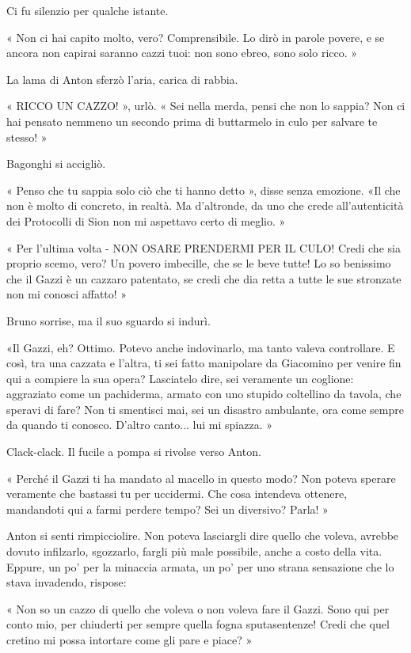 Ci fu silenzio per qualche istante.

« Non ci hai capito molto, vero? Comprensibile. Lo dirò in parole povere, e se ancora non capirai saranno cazzi tuoi: non sono ebreo, sono solo ricco. »

La lama di Anton sferzò l'aria, carica di rabbia.

« RICCO UN CAZZO! », urlò. « Sei nella merda, pensi che non lo sappia? Non ci hai pensato nemmeno un secondo prima di buttarmelo in culo per salvare te stesso! »

Bagonghi si accigliò.

« Penso che tu sappia solo ciò che ti hanno detto », disse senza emozione. «Il che non è molto di concreto, in realtà. Ma d'altronde, da uno che crede all'autenticità dei Protocolli di Sion non mi aspettavo certo di meglio. »

« Per l'ultima volta - NON OSARE PRENDERMI PER IL CULO! Credi che sia proprio scemo, vero? Un povero imbecille, che se le beve tutte! Lo so benissimo che il Gazzi è un cazzaro patentato, se credi che dia retta a tutte le sue stronzate non mi conosci affatto! »

Bruno sorrise, ma il suo sguardo si indurì.

«Il Gazzi, eh? Ottimo. Potevo anche indovinarlo, ma tanto valeva controllare. E così, tra una cazzata e l'altra, ti sei fatto manipolare da Giacomino per venire fin qui a compiere la sua opera? Lasciatelo dire, sei veramente un coglione: aggraziato come un pachiderma, armato con uno stupido coltellino da tavola, che speravi di fare? Non ti smentisci mai, sei un disastro ambulante, ora come sempre da quando ti conosco. D'altro canto... lui mi spiazza. »

Clack-clack. Il fucile a pompa si rivolse verso Anton.

« Perché il Gazzi ti ha mandato al macello in questo modo? Non poteva sperare veramente che bastassi tu per uccidermi. Che cosa intendeva ottenere, mandandoti qui a farmi perdere tempo? Sei un diversivo? Parla! »   

Anton si senti rimpicciolire. Non poteva lasciargli dire quello che voleva, avrebbe dovuto infilzarlo, sgozzarlo, fargli più male possibile, anche a costo della vita. Eppure, un po' per la minaccia armata, un po' per uno strana sensazione che lo stava invadendo, rispose:

« Non so un cazzo di quello che voleva o non voleva fare il Gazzi. Sono qui per conto mio, per chiuderti per sempre quella fogna sputasentenze! Credi che quel cretino mi possa intortare come gli pare e piace? »

